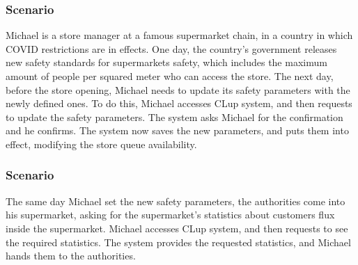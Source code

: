 \documentclass[../../main.tex]{subfiles}
\begin{document}
\subsubsection{Scenario }

  Michael is a store manager at a famous supermarket chain, in a country in which COVID 
  restrictions are in effects.
  One day, the country's government releases new safety standards for supermarkets safety, which 
  includes the maximum amount of people per squared meter who can access the store. 
  The next day, before the store opening, Michael needs to update its safety parameters with the 
  newly defined ones. 
  To do this, Michael accesses CLup system, and then requests to update the safety parameters. 
  The system asks Michael for the confirmation and he confirms. 
  The system now saves the new parameters, and puts them into effect, modifying the store queue 
  availability.



\subsubsection{Scenario }

  The same day Michael set the new safety parameters, the authorities come into his supermarket, 
  asking for the supermarket's statistics about customers flux inside the supermarket. 
  Michael accesses CLup system, and then requests to see the required statistics. 
  The system provides the requested statistics, and Michael hands them to the authorities. 
\end{document}
